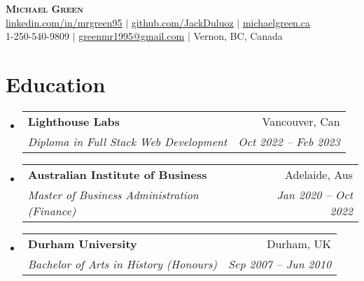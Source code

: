 \documentclass[letterpaper,11pt]{article}
\makeatletter
\newcommand{\resumeSubheading}[4]{
  \vspace{-2pt}\item
    \begin{tabular*}{0.97\textwidth}[t]{l@{\extracolsep{\fill}}r}
      \textbf{#1} & #2 \\
      \textit{\small#3} & \textit{\small #4} \\
    \end{tabular*}\vspace{-7pt}
}
\newcommand{\resumeSubHeadingListStart}{\begin{itemize}[leftmargin=0.15in, label={}]}
\newcommand{\resumeSubHeadingListEnd}{\end{itemize}}
\makeatother
\begin{document}

\begin{center}
    \textbf{\Huge \scshape Michael Green} \\ \vspace{2pt}
    \small
    \href{https://www.linkedin.com/in/mrgreen95/}{\underline{linkedin.com/in/mrgreen95}} \hspace{2pt} $|$ \hspace{2pt}
    \href{https://github.com/JackDuluoz}{\underline{github.com/JackDuluoz}} \hspace{2pt} $|$ \hspace{2pt}
    \href{https://jackduluoz.github.io/portfolio/}
    {\underline{michaelgreen.ca}}
    \\ \vspace{2pt}
    \small 1-250-540-9809 \hspace{4pt} $|$ \hspace{4pt} 
    \href{mailto:greenmr1995@gmail.com}{\underline{greenmr1995@gmail.com}} \hspace{4pt} $|$ \hspace{4pt}    
    \small Vernon, BC, Canada
    
\end{center}


\section{Education}
  \resumeSubHeadingListStart
    \resumeSubheading
      {Lighthouse Labs}{Vancouver, Can}
      {Diploma in Full Stack Web Development}{Oct 2022 -- Feb 2023}
    \resumeSubheading
      {Australian Institute of Business}{Adelaide, Aus}
      {Master of Business Administration (Finance)}{Jan 2020 -- Oct 2022}
    \resumeSubheading
      {Durham University}{Durham, UK}
      {Bachelor of Arts in History (Honours)}{Sep 2007 -- Jun 2010}
  \resumeSubHeadingListEnd



\end{document}

